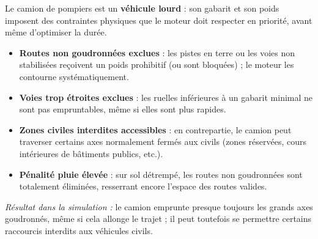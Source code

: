 \documentclass[12pt,a4paper]{article}
\begin{document}
\bigskip

\begin{tcolorbox}[colback=orangeclair, colframe=attention, fonttitle=\bfseries\large,
  title={[Pompiers] Camion de pompiers — Contraintes physiques fortes},
  breakable, sharp corners=south]

Le camion de pompiers est un \textbf{véhicule lourd} : son gabarit et son poids
imposent des contraintes physiques que le moteur doit respecter en priorité,
avant même d'optimiser la durée.

\begin{itemize}[leftmargin=1.5em, itemsep=3pt]
  \item \textbf{Routes non goudronnées exclues} : les pistes en terre ou les voies
        non stabilisées reçoivent un poids prohibitif (ou sont bloquées) ;
        le moteur les contourne systématiquement.
  \item \textbf{Voies trop étroites exclues} : les ruelles inférieures à un gabarit
        minimal ne sont pas empruntables, même si elles sont plus rapides.
  \item \textbf{Zones civiles interdites accessibles} : en contrepartie, le camion
        peut traverser certains axes normalement fermés aux civils
        (zones réservées, cours intérieures de bâtiments publics, etc.).
  \item \textbf{Pénalité pluie élevée} : sur sol détrempé, les routes non goudronnées
        sont totalement éliminées, resserrant encore l'espace des routes valides.
\end{itemize}

\smallskip
\textit{Résultat dans la simulation :} le camion emprunte presque toujours les
grands axes goudronnés, même si cela allonge le trajet ; il peut toutefois
se permettre certains raccourcis interdits aux véhicules civils.

\end{tcolorbox}

\bigskip
\end{document}

